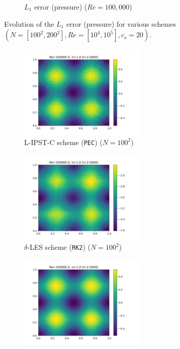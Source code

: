 \begin{figure}[htbp!]
\begin{subfigure}{7cm}
  \caption{$L_1$ error (pressure) ($Re = 100,000$)}
  \end{subfigure}
  \caption{Evolution of the $L_1$ error (pressure) for various schemes $(N=[100^2, 200^2], Re=[10^4, 10^5], c_s=20)$.}
  \label{fig:ltgv-pl1}
\end{figure}

\begin{figure}[htbp!]
  \begin{subfigure}{7cm}
    \centering\includegraphics[width=6cm]{Code-Figures/long-tgv/c0_20_tait_hdx_2_pec_dtmul_1_sd_n_o_files_50_nx_100_pst_10_re_100000_tsph_wcsph_tf_2/final_p.png}
    \caption{L-IPST-C scheme (\texttt{PEC}) ($N=100^2$)}
  \end{subfigure}
  \begin{subfigure}{7cm}
    \centering\includegraphics[width=6cm]{Code-Figures/long-tgv/c0_20_tait_hdx_2_rk2_dtmul_1.5_n_o_files_50_nx_100_pst_10_re_100000_deltales_tf_2/final_p.png}
    \caption{$\delta$-LES scheme (\texttt{RK2}) ($N=100^2$)}
  \end{subfigure}
  \begin{subfigure}{7cm}
  \centering\includegraphics[width=6cm]{Code-Figures/long-tgv/c0_20_tait_hdx_2_pec_dtmul_1_sd_n_o_files_50_nx_200_pst_10_re_100000_tsph_wcsph_tf_2/final_p.png}

\end{subfigure}
\end{figure}
